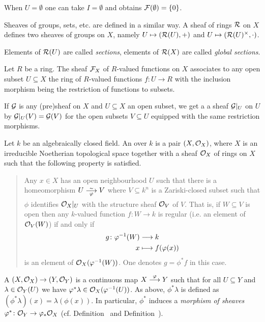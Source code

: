 \documentclass[a4paper,parskip=half,numbers=enddot, DIV=12]{scrreprt}
\begin{document}
\begin{rem}
    When $U=\emptyset$ one can take $I=\emptyset$ and obtains $\mathcal{F}(\emptyset) = \{0\}$.
\end{rem}
\begin{rem}
    Sheaves of groups, sets, etc. are defined in a similar way. A sheaf of rings $\mathcal{R}$ on $X$ defines two sheaves of groups on $X$, namely $U\mapsto (\mathcal{R}(U), +)$ and $U\mapsto (\mathcal{R}(U)^\times, \cdot)$.
\end{rem}
\begin{rem}
    Elements of $\mathcal{R}(U)$ are called \emph{sections}, elements of $\mathcal{R}(X)$ are called \emph{global sections}.
\end{rem}
\begin{example}
	    Let $R$ be a ring. The sheaf $\mathcal{F}_X$ of $R$-valued functions on $X$ associates to any open subset $U\subseteq X$ the ring of $R$-valued functions $f\colon U \to R$ with the inclusion morphism being the restriction of functions to subsets.
\end{example}
\begin{rem*}
	  If $\mathcal{G}$ is any (pre)sheaf on $X$ and $U\subseteq X$ an open subset, we get a a sheaf $\mathcal{G}|_U$ on $U$ by $\mathcal{G}|_U(V) = \mathcal{G}(V)$ for the open subsets $V\subseteq U$ equipped with the same restriction morphisms.
\end{rem*}
\begin{defi} 
	    Let $k$ be an algebraically closed field. An  over $k$ is a pair $(X,\mathcal{O}_X)$, where $X$ is an irreducible Noetherian topological space together with a sheaf $\mathcal{O}_X$ of rings on $X$ such that the following property is satisfied.
	    \begin{quote}
	        Any $x\in X$ has an open neighbourhood $U$ such that there is a homeomorphism $U\isomorphism[\phi] V$ where $V\subseteq k^n$ is a Zariski-closed subset such that $\phi$ identifies $\mathcal{O}_X|_U$ with the structure sheaf $\mathcal{O}_V$ of $V$. That is, if $W \subseteq V$ is open then any $k$-valued function $f\colon W\to k$ is regular (i.e. an element of $\mathcal{O}_V(W)$) if and only if 
	        \begin{align*}
	            g\colon \varphi^{-1}(W) &\longrightarrow k\\
	            x&\longmapsto f(\varphi(x))
	        \end{align*}
	        is an element of $\mathcal{O}_X(\varphi^{-1}(W))$. One denotes $g=\phi^*f$ in this case.
	    \end{quote}
	    A  $(X,\mathcal{O}_X) \to (Y,\mathcal{O}_Y)$ is a continuous map $X\morphism[\phi] Y$ such that for all $U\subseteq Y$ and $\lambda \in \mathcal{O}_Y(U)$ we have $\varphi^\ast \lambda \in \mathcal{O}_X(\varphi^{-1}(U))$. As above, $\phi^\ast\lambda$ is defined as $(\phi^\ast\lambda)(x) = \lambda(\phi(x))$. In particular, $\phi^*$ induces a \emph{morphism of sheaves} $\varphi^*\colon \mathcal{O}_Y\to\varphi_*\mathcal{O}_X$ (cf. Definition~ and Definition~).
	\end{defi}
\end{document}
